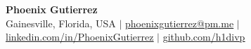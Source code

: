 \begin{center}
    \textbf{\Huge Phoenix Gutierrez} \\ \vspace{1pt}
    \small Gainesville, Florida, USA $|$
    \href{mailto:phoenixgutierrez@pm.me}{\underline{phoenixgutierrez@pm.me}} $|$
    \href{https://linkedin.com/in/PhoenixGutierrez}{\underline{linkedin.com/in/PhoenixGutierrez}} $|$
    \href{https://github.com/h1divp}{\underline{github.com/h1divp}}
\end{center}
